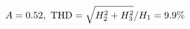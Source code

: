 \documentclass[preview]{standalone}
\begin{document}
\begin{align*}
\special{dvisvgm:raw <g id='unique000'>}A=0.52,\ \text{THD}=\sqrt{H_2^2+H_3^2}/H_1=9.9\%\special{dvisvgm:raw </g>}
\end{align*}
\end{document}

